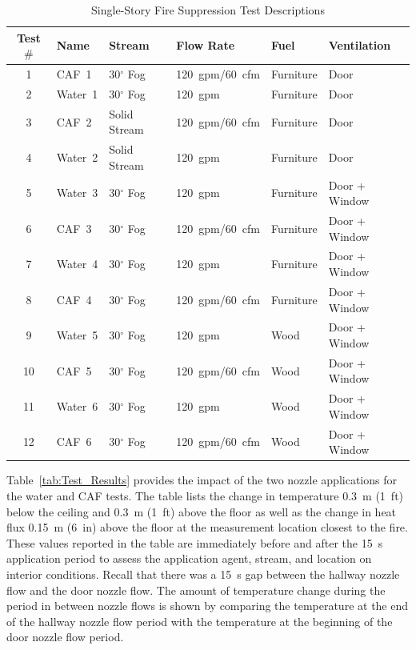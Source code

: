 \documentclass[12pt,oneside]{book}
\begin{document}
\begin{table}[!ht]
\centering
\caption{Single-Story Fire Suppression Test Descriptions}\label{tab:Test_Descriptions}
\begin{tabular}{clllll}
\toprule[1.5pt]
Test $\#$  & Name	& Stream			& Flow Rate		& Fuel           & Ventilation     \\
\midrule
 1 & CAF~1    &  30$^{\circ}$ Fog   &  120~gpm/60~cfm   & Furniture      & Door            \\
 2 & Water~1  &  30$^{\circ}$ Fog  	&  120~gpm    		& Furniture      & Door            \\
 3 & CAF~2    &  Solid Stream       &  120~gpm/60~cfm   & Furniture      & Door            \\
 4 & Water~2  &  Solid Stream       &  120~gpm    		& Furniture      & Door            \\
 5 & Water~3  &  30$^{\circ}$ Fog  	&  120~gpm    		& Furniture      & Door + Window   \\
 6 & CAF~3    &  30$^{\circ}$ Fog   &  120~gpm/60~cfm   & Furniture      & Door + Window   \\
 7 & Water~4  &  30$^{\circ}$ Fog  	&  120~gpm    		& Furniture      & Door + Window   \\
 8 & CAF~4    &  30$^{\circ}$ Fog   &  120~gpm/60~cfm   & Furniture      & Door + Window   \\
 9 & Water~5  &  30$^{\circ}$ Fog  	&  120~gpm   		& Wood           & Door + Window   \\
10 & CAF~5    &  30$^{\circ}$ Fog   &  120~gpm/60~cfm   & Wood           & Door + Window   \\
11 & Water~6  &  30$^{\circ}$ Fog  	&  120~gpm    		& Wood           & Door + Window   \\
12 & CAF~6    &  30$^{\circ}$ Fog   &  120~gpm/60~cfm   & Wood           & Door + Window   \\
\bottomrule[1.25pt]
\end{tabular}\par
\end{table}

Table~\ref{tab:Test_Results} provides the impact of the two nozzle applications for the water and CAF tests. The table lists the change in temperature 0.3~m (1~ft) below the ceiling and 0.3~m (1~ft) above the floor as well as the change in heat flux 0.15~m (6~in) above the floor at the measurement location closest to the fire. These values reported in the table are immediately before and after the 15~s application period to assess the application agent, stream, and location on interior conditions. Recall that there was a 15~s gap between the hallway nozzle flow and the door nozzle flow. The amount of temperature change during the period in between nozzle flows is shown by comparing the temperature at the end of the hallway nozzle flow period with the temperature at the beginning of the door nozzle flow period.
\end{document}
